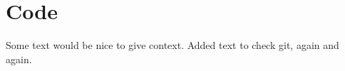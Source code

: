 

\chapter{Code}

Some text would be nice to give context.
Added text to check git, again and again.

